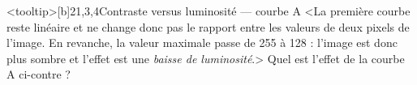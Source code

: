 \begin{quiz}[title={Photographie numérique}]
%
\begin{quizquestion*}<tooltip>[b]{2}{1,3,4}{Contraste {\upshape versus} luminosité --- courbe A}
<La première courbe reste linéaire et ne change donc pas le rapport entre les valeurs de deux pixels de l'image. En revanche, la valeur maximale passe de 255 à 128 : l'image est donc plus sombre et l'effet est une \emph{baisse de luminosité}.>
Quel est l'effet de la courbe A ci-contre ?
\end{quizquestion*}

\pagebreak


\end{quiz}
